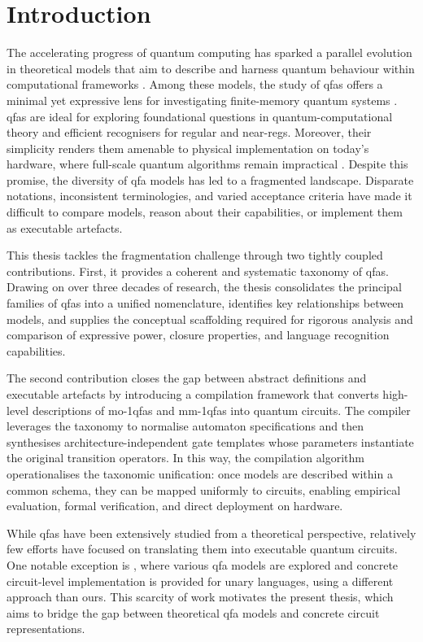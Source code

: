 \chapter{Introduction}
\label{chap:introduction}

The accelerating progress of quantum computing has sparked a parallel evolution in theoretical models that aim to describe and harness quantum behaviour within computational frameworks \cite{deutsch1985quantum}. Among these models, the study of \glspl{qfa} offers a minimal yet expressive lens for investigating finite-memory quantum systems \cite{ambainis19981,moore2000quantum}. \Glspl{qfa} are ideal for exploring foundational questions in quantum-computational theory and efficient recognisers for regular and near-\gls{reg}s. Moreover, their simplicity renders them amenable to physical implementation on today's hardware, where full-scale quantum algorithms remain impractical \cite{arute2019quantum}. Despite this promise, the diversity of \gls{qfa} models has led to a fragmented landscape. Disparate notations, inconsistent terminologies, and varied acceptance criteria have made it difficult to compare models, reason about their capabilities, or implement them as executable artefacts.

This thesis tackles the fragmentation challenge through two tightly coupled contributions. First, it provides a coherent and systematic taxonomy of \glspl{qfa}. Drawing on over three decades of research, the thesis consolidates the principal families of \glspl{qfa} into a unified nomenclature, identifies key relationships between models, and supplies the conceptual scaffolding required for rigorous analysis and comparison of expressive power, closure properties, and language recognition capabilities.

The second contribution closes the gap between abstract definitions and executable artefacts by introducing a compilation framework that converts high-level descriptions of \glspl{mo-1qfa} and \glspl{mm-1qfa} into quantum circuits. The compiler leverages the taxonomy to normalise automaton specifications and then synthesises architecture-independent gate templates whose parameters instantiate the original transition operators. In this way, the compilation algorithm operationalises the taxonomic unification: once models are described within a common schema, they can be mapped uniformly to circuits, enabling empirical evaluation, formal verification, and direct deployment on hardware.

While \glspl{qfa} have been extensively studied from a theoretical perspective, relatively few efforts have focused on translating them into executable quantum circuits. One notable exception is \cite{baik2024framework}, where various \gls{qfa} models are explored and concrete circuit-level implementation is provided for unary languages, using a different approach than ours. This scarcity of work motivates the present thesis, which aims to bridge the gap between theoretical \gls{qfa} models and concrete circuit representations.

